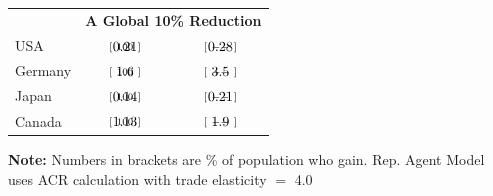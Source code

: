 \documentclass[12pt,pdftex]{article}
\begin{document}
\begin{onehalfspacing}
\begin{table}[t]
\begin{center}
\begin{tabular}{l c c}
\hline
& \multicolumn{2}{c}{\small \textbf{A Global 10\% Reduction}} \\
\footnotesize  USA  & $\begin{array}{c}0.21 \vspace{-.45cm}\\ \scriptstyle [ \ 100 \ ]\end{array}$   & $\begin{array}{c}0.28 \vspace{-.45cm}\\ \scriptstyle [ \ -- \ ]\end{array}$\\
\footnotesize  Germany  & $\begin{array}{c}1.6 \vspace{-.45cm}\\ \scriptstyle [ \ 100 \ ]\end{array}$   & $\begin{array}{c}3.5 \vspace{-.45cm}\\ \scriptstyle [ \ -- \ ]\end{array}$\\
\footnotesize  Japan  & $\begin{array}{c}0.14 \vspace{-.45cm}\\ \scriptstyle [ \ 100 \ ]\end{array}$   & $\begin{array}{c}0.21 \vspace{-.45cm}\\ \scriptstyle [ \ -- \ ]\end{array}$\\
\footnotesize  Canada  & $\begin{array}{c}1.13 \vspace{-.45cm}\\ \scriptstyle [ \ 100 \ ]\end{array}$   & $\begin{array}{c}1.9 \vspace{-.45cm}\\ \scriptstyle [ \ -- \ ]\end{array}$\\
\hline
\end{tabular}
\parbox[c]{6.0in}{\vspace{.1cm}
{\footnotesize \textbf{Note:} Numbers in brackets are \% of population who gain. Rep. Agent Model uses ACR calculation with trade elasticity $=$ 4.0}}
\end{center}
\end{table}


\end{onehalfspacing}
\end{document}
